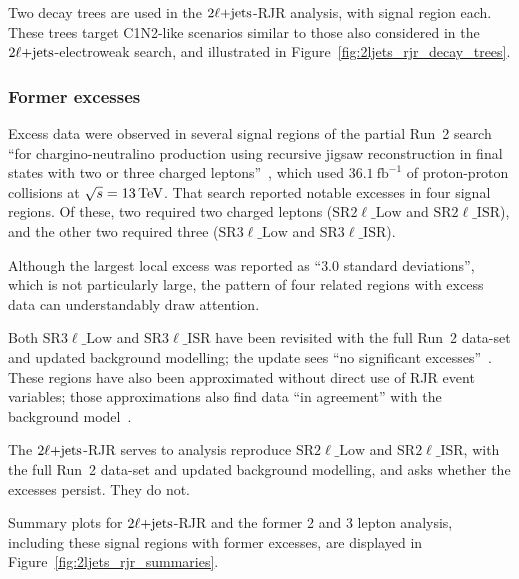 Two decay trees are used in the $\twoljets$-RJR analysis, with signal region
each.
These trees target C1N2-like scenarios similar to those also considered in the
$\twoljets$-electroweak search,
and illustrated in Figure~\ref{fig:2ljets_rjr_decay_trees}.

\subsubsection{Former excesses}
Excess data were observed in several signal regions of the partial Run~2
search ``for chargino-neutralino production using recursive
jigsaw reconstruction in final states with two or three charged
leptons''~\cite{atlas_rjr_23l_SUSY_2017_03},
which used $36.1~\mathrm{fb}^{-1}$ of proton-proton collisions at
$\sqrt{s} = 13\,\eV[T]$.
That search reported notable excesses in four signal regions.
Of these, two required two charged leptons
($\mathrm{SR}2\ell\_\mathrm{Low}$ and $\mathrm{SR}2\ell\_\mathrm{ISR}$),
and the other two required three
($\mathrm{SR}3\ell\_\mathrm{Low}$ and $\mathrm{SR}3\ell\_\mathrm{ISR}$).

Although the largest local excess was reported as ``$3.0$ standard deviations'',
which is not particularly large, the pattern of four related regions with
excess data can understandably draw attention.

Both $\mathrm{SR}3\ell\_\mathrm{Low}$ and $\mathrm{SR}3\ell\_\mathrm{ISR}$
have been revisited with the full Run~2 data-set and updated background
modelling;
the update sees ``no significant excesses''~\cite{atlas_rjr_3l_SUSY_2019_09}.
These regions have also been approximated without direct use of RJR event
variables;
those approximations also find data ``in agreement'' with the background
model~\cite{atlas_rjr_mimic_SUSY_2018_06}.

The $\twoljets$-RJR serves to analysis reproduce
$\mathrm{SR}2\ell\_\mathrm{Low}$ and $\mathrm{SR}2\ell\_\mathrm{ISR}$,
with the full Run~2 data-set and updated background modelling,
and asks whether the excesses persist.
They do not.

Summary plots for $\twoljets$-RJR and the former 2 and 3 lepton analysis,
including these signal regions with former excesses,
are displayed in Figure~\ref{fig:2ljets_rjr_summaries}.

